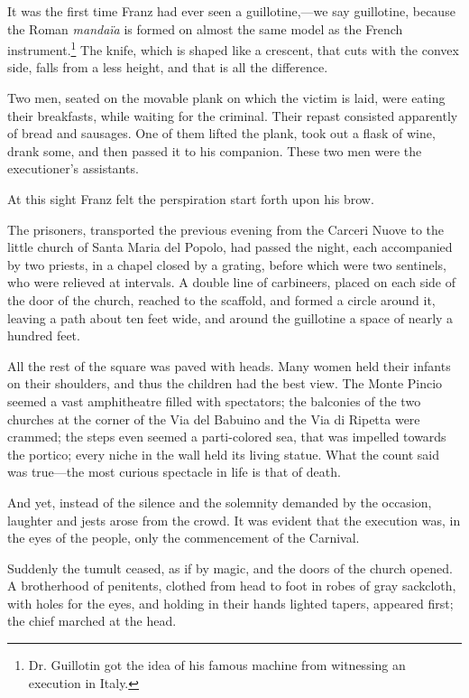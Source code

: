 It was the first time Franz had ever seen a guillotine,—we say
guillotine, because the Roman \textit{mandaïa} is formed on almost the same
model as the French instrument.\footnote[7]{Dr. Guillotin got the idea of
his famous machine from witnessing an execution in Italy.} The knife, which is shaped like a
crescent, that cuts with the convex side, falls from a less height, and
that is all the difference.

Two men, seated on the movable plank on which the victim is laid, were
eating their breakfasts, while waiting for the criminal. Their repast
consisted apparently of bread and sausages. One of them lifted the
plank, took out a flask of wine, drank some, and then passed it to his
companion. These two men were the executioner’s assistants.

At this sight Franz felt the perspiration start forth upon his brow.

The prisoners, transported the previous evening from the Carceri Nuove
to the little church of Santa Maria del Popolo, had passed the night,
each accompanied by two priests, in a chapel closed by a grating,
before which were two sentinels, who were relieved at intervals. A
double line of carbineers, placed on each side of the door of the
church, reached to the scaffold, and formed a circle around it, leaving
a path about ten feet wide, and around the guillotine a space of nearly
a hundred feet.

All the rest of the square was paved with heads. Many women held their
infants on their shoulders, and thus the children had the best view.
The Monte Pincio seemed a vast amphitheatre filled with spectators; the
balconies of the two churches at the corner of the Via del Babuino and
the Via di Ripetta were crammed; the steps even seemed a parti-colored
sea, that was impelled towards the portico; every niche in the wall
held its living statue. What the count said was true—the most curious
spectacle in life is that of death.

And yet, instead of the silence and the solemnity demanded by the
occasion, laughter and jests arose from the crowd. It was evident that
the execution was, in the eyes of the people, only the commencement of
the Carnival.

Suddenly the tumult ceased, as if by magic, and the doors of the church
opened. A brotherhood of penitents, clothed from head to foot in robes
of gray sackcloth, with holes for the eyes, and holding in their hands
lighted tapers, appeared first; the chief marched at the head.


